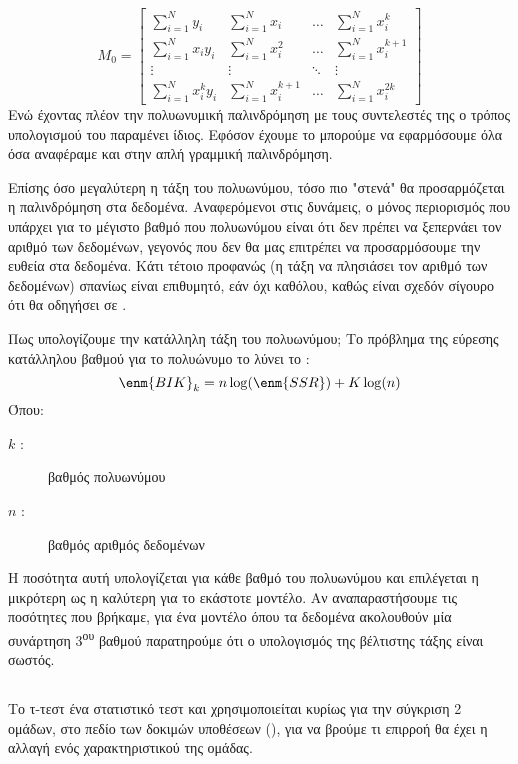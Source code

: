 $$
M_0=
\begin{bmatrix}
    \sum\limits_{i=1}^Ny_i          & \sum\limits_{i=1}^Nx_i        & \dots     & \sum\limits_{i=1}^Nx_i^k \\
    \sum\limits_{i=1}^Nx_iy_i          & \sum\limits_{i=1}^Nx_i^2      & \dots     & \sum\limits_{i=1}^Nx_i^{k+1} \\
    \vdots                          & \vdots                        & \ddots    & \vdots \\
    \sum\limits_{i=1}^Nx_i^ky_i        & \sum\limits_{i=1}^Nx_i^{k+1}  & \dots     & \sum\limits_{i=1}^Nx_i^{2k}
\end{bmatrix}
$$
Ενώ έχοντας πλέον την πολυωνυμική παλινδρόμηση με τους συντελεστές της ο τρόπος
υπολογισμού του  παραμένει ίδιος. Εφόσον έχουμε το  μπορούμε να εφαρμόσουμε
όλα όσα αναφέραμε και στην απλή γραμμική παλινδρόμηση.

Επίσης όσο μεγαλύτερη η τάξη του πολυωνύμου, τόσο πιο "στενά" θα προσαρμόζεται η
παλινδρόμηση στα δεδομένα. Αναφερόμενοι στις δυνάμεις, ο μόνος περιορισμός που
υπάρχει για το μέγιστο βαθμό που πολυωνύμου είναι ότι δεν πρέπει να ξεπερνάει τον αριθμό
των δεδομένων, γεγονός που δεν θα μας επιτρέπει να προσαρμόσουμε την ευθεία στα
δεδομένα. Κάτι τέτοιο προφανώς (η τάξη να πλησιάσει τον αριθμό των δεδομένων) σπανίως
είναι επιθυμητό, εάν όχι καθόλου, καθώς είναι σχεδόν σίγουρο ότι θα οδηγήσει σε .

Πως υπολογίζουμε την κατάλληλη τάξη του πολυωνύμου;
Το πρόβλημα της εύρεσης κατάλληλου βαθμού για το πολυώνυμο το λύνει το :
$$\enm{BIK}_k=n\log (\enm{SSR})+K\log (n)$$
Όπου:
\begin{description}
    \item[$k$ :] βαθμός πολυωνύμου
    \item[$n$ :] βαθμός αριθμός δεδομένων
\end{description}
Η ποσότητα αυτή υπολογίζεται για κάθε βαθμό του πολυωνύμου και επιλέγεται η μικρότερη
ως η καλύτερη για το εκάστοτε μοντέλο. Αν αναπαραστήσουμε τις ποσότητες που
βρήκαμε, για ένα μοντέλο όπου τα δεδομένα ακολουθούν μία συνάρτηση 3\textsuperscript{ου} βαθμού
παρατηρούμε ότι ο υπολογισμός της βέλτιστης τάξης είναι σωστός.
\subsection{}
Το τ-τεστ ένα στατιστικό τεστ και χρησιμοποιείται κυρίως για την σύγκριση 2 ομάδων, στο
πεδίο των δοκιμών υποθέσεων (), για να βρούμε τι επιρροή θα έχει η
αλλαγή ενός χαρακτηριστικού της ομάδας.

